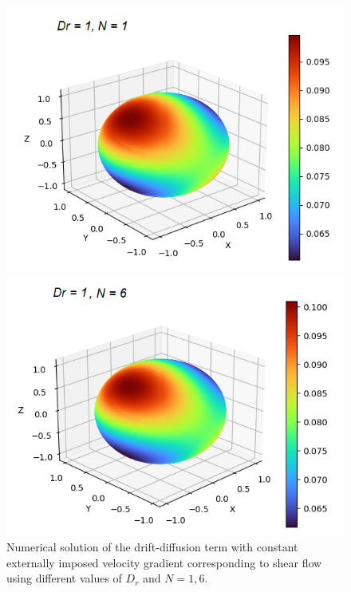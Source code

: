 \begin{frame}
\begin{figure}[H]
\begin{minipage}{0.4\textwidth}
		  \includegraphics[scale=0.4]{Bilder_wx/wx=1_Dr=1_N=1}
	    \end{minipage}
         \hfill 
        \begin{minipage}{0.4\textwidth}
	      \includegraphics[scale=0.4]{Bilder_wx/wx=1_Dr=1_N=6}
        \end{minipage}
		\caption{ Numerical solution of the drift-diffusion term with constant externally imposed velocity gradient corresponding to shear flow using different values of $D_r$ and $N = 1,6$.}
	\end{figure}
\end{frame}

